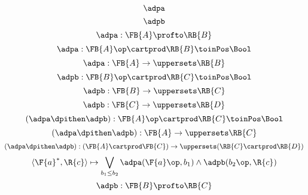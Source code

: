 {\begin{forslides}
    \begin{equation}
        \label{eq:adpa}
        \adpa
    \end{equation}
    \begin{equation}
        \label{eq:adpb}
        \adpb
    \end{equation}
    \begin{equation}
        \label{eq:adp1}
        \adpa: \FB{A} \profto  \RB{B}
    \end{equation}
    \begin{equation}
        \label{eq:adp1pf}
        \adpa: \FB{A}\op \cartprod  \RB{B}  \toinPos \Bool
    \end{equation}
    \begin{equation}
        \label{eq:adp1us}
        \adpa: \FB{A} \to \uppersets \RB{B}
    \end{equation}
    \begin{equation}
        \label{eq:adp2pf}
        \adpb: \FB{B}\op \cartprod  \RB{C}  \toinPos  \Bool
    \end{equation}
    \begin{equation}
        \label{eq:adp2us}
        \adpb: \FB{B} \to \uppersets \RB{C}
    \end{equation}
    \begin{equation}
        \label{eq:adp3us}
        \adpb: \FB{C} \to \uppersets \RB{D}
    \end{equation}
    \begin{equation}
        \label{eq:adp12pf}
        (\adpa\dpithen\adpb): \FB{A}\op \cartprod  \RB{C}  \toinPos  \Bool
    \end{equation}
    \begin{equation}
        \label{eq:adp12us}
        (\adpa\dpithen\adpb): \FB{A}  \to\uppersets \RB{C}
    \end{equation}
    \begin{equation}
        \label{eq:adpM12us}
        (\adpa\dpithen\adpb):(\FB{A} \cartprod \FB{C})  \to\uppersets (\RB{C} \cartprod \RB{D})
    \end{equation}
    \begin{equation}
        \label{eq:adp12pfexpr}
        \langle\F{a}^*, \R{c}\rangle \mapsto \bigvee_{b_1\leq b_2} \adpa(\F{a}\op, b_1) \wedge \adpb(b_2\op, \R{c})
    \end{equation}
    \begin{equation}
        \label{eq:adp2}
        \adpb: \FB{B} \profto  \RB{C}

\end{equation}
\end{forslides}}
